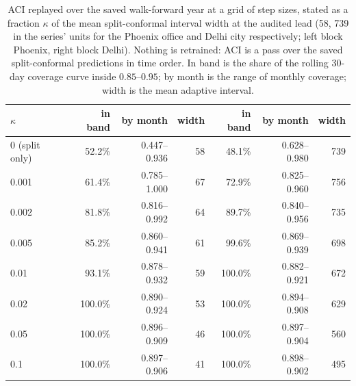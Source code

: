 \begin{table}[t]
\centering
\footnotesize
\setlength{\tabcolsep}{3pt}
\begin{tabular}{lrrrrrr}
\toprule
$\kappa$ & in band & by month & width & in band & by month & width \\
\midrule
0 (split only) & 52.2\% & 0.447--0.936 & 58 & 48.1\% & 0.628--0.980 & 739 \\
0.001 & 61.4\% & 0.785--1.000 & 67 & 72.9\% & 0.825--0.960 & 756 \\
0.002 & 81.8\% & 0.816--0.992 & 64 & 89.7\% & 0.840--0.956 & 735 \\
0.005 & 85.2\% & 0.860--0.941 & 61 & 99.6\% & 0.869--0.939 & 698 \\
0.01 & 93.1\% & 0.878--0.932 & 59 & 100.0\% & 0.882--0.921 & 672 \\
0.02 & 100.0\% & 0.890--0.924 & 53 & 100.0\% & 0.894--0.908 & 629 \\
0.05 & 100.0\% & 0.896--0.909 & 46 & 100.0\% & 0.897--0.904 & 560 \\
0.1 & 100.0\% & 0.897--0.906 & 41 & 100.0\% & 0.898--0.902 & 495 \\
\bottomrule
\end{tabular}
\caption{ACI replayed over the saved walk-forward year at a grid of step sizes, stated as a fraction $\kappa$ of the mean split-conformal interval width at the audited lead (58, 739 in the series' units for the Phoenix office and Delhi city respectively; left block Phoenix, right block Delhi). Nothing is retrained: ACI is a pass over the saved split-conformal predictions in time order. In band is the share of the rolling 30-day coverage curve inside $0.85$--$0.95$; by month is the range of monthly coverage; width is the mean adaptive interval.}
\label{tab:aci-gamma}
\end{table}
